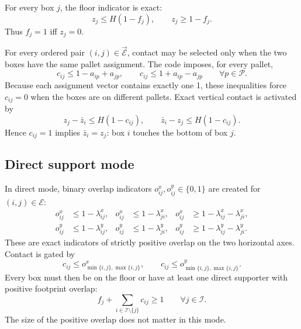 \documentclass[11pt]{article}
\newcommand{\Items}{\mathcal I}
\newcommand{\Pallets}{\mathcal P}
\newcommand{\Pairs}{\mathcal E}
\newcommand{\OPairs}{\overrightarrow{\mathcal E}}
\newcommand{\B}{\{0,1\}}
\begin{document}
For every box $j$, the floor indicator is exact:
\begin{equation}
 z_j\le H(1-f_j),\qquad z_j\ge1-f_j.
 \label{eq:floor}
\end{equation}
Thus $f_j=1$ iff $z_j=0$.

For every ordered pair $(i,j)\in\OPairs$, contact may be selected only when the
two boxes have the same pallet assignment.  The code imposes, for every pallet,
\begin{equation}
 c_{ij}\le1-a_{ip}+a_{jp},\qquad
 c_{ij}\le1+a_{ip}-a_{jp}
 \qquad\forall p\in\Pallets.
 \label{eq:same-pallet-contact}
\end{equation}
Because each assignment vector contains exactly one 1, these inequalities
force $c_{ij}=0$ when the boxes are on different pallets.  Exact vertical
contact is activated by
\begin{equation}
 z_j-\bar z_i\le H(1-c_{ij}),\qquad
 \bar z_i-z_j\le H(1-c_{ij}).
 \label{eq:vertical-contact}
\end{equation}
Hence $c_{ij}=1$ implies $\bar z_i=z_j$: box $i$ touches the bottom of box $j$.

\subsection{Direct support mode}

In direct mode, binary overlap indicators $o^x_{ij},o^y_{ij}\in\B$ are
created for $(i,j)\in\Pairs$:
\begin{align}
 o^x_{ij}&\le1-\lambda^x_{ij},&
 o^x_{ij}&\le1-\lambda^x_{ji},&
 o^x_{ij}&\ge1-\lambda^x_{ij}-\lambda^x_{ji},\label{eq:direct-overlap-x}\\
 o^y_{ij}&\le1-\lambda^y_{ij},&
 o^y_{ij}&\le1-\lambda^y_{ji},&
 o^y_{ij}&\ge1-\lambda^y_{ij}-\lambda^y_{ji}.
 \label{eq:direct-overlap-y}
\end{align}
These are exact indicators of strictly positive overlap on the two horizontal
axes.  Contact is gated by
\begin{equation}
 c_{ij}\le o^x_{\min\{i,j\},\max\{i,j\}},\qquad
 c_{ij}\le o^y_{\min\{i,j\},\max\{i,j\}}.
 \label{eq:direct-contact-overlap}
\end{equation}
Every box must then be on the floor or have at least one direct supporter with
positive footprint overlap:
\begin{equation}
 f_j+\sum_{i\in\Items\setminus\{j\}}c_{ij}\ge1
 \qquad\forall j\in\Items.
 \label{eq:direct-support}
\end{equation}
The size of the positive overlap does not matter in this mode.
\end{document}
